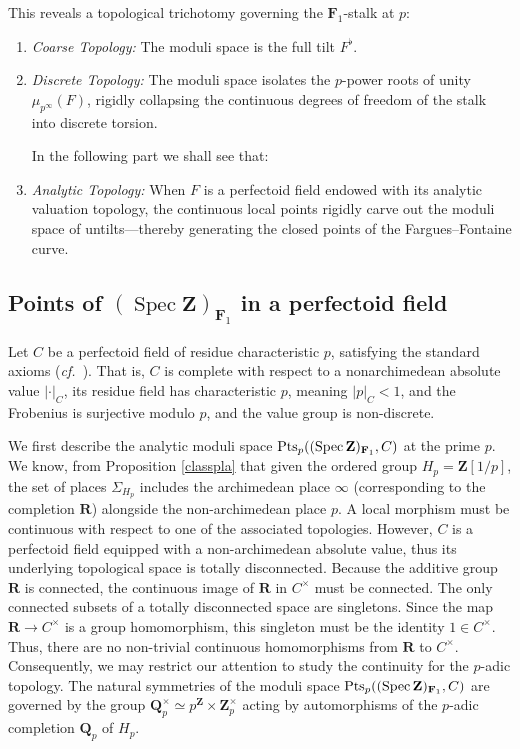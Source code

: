 \documentclass[11pt,a4paper]{article}
\newcommand{\Q}{\mathbf{Q}}
\newcommand{\R}{\mathbf{R}}
\newcommand{\Z}{\mathbf{Z}}
\newcommand{\Fone}{\mathbf{F}_{1}}
\def\spzf{(\Spec \Z)_{\mathbf{F}_{1}}}
\newcommand{\Pt}{{\rm Pts}}
\newcommand{\Spec}{\operatorname{Spec}}
\def\cf{{\it cf.\/}\ }
\begin{document}
This reveals a  topological trichotomy governing the $\Fone$-stalk at $p$:
\begin{enumerate}
    \item \emph{Coarse Topology:} The moduli space is the full tilt $F^\flat$.
    \item \emph{Discrete Topology:}  The moduli space isolates the $p$-power roots of unity $\mu_{p^\infty}(F)$, rigidly collapsing the continuous degrees of freedom of the stalk into discrete torsion.\vspace{.03in}

    In the following part we shall see that:
    
    \item \emph{Analytic Topology:} When $F$ is a perfectoid field endowed with its analytic valuation topology, the continuous local points rigidly carve out the moduli space of untilts---thereby generating the closed points of the Fargues--Fontaine curve.
    \end{enumerate}


    
    \subsection{Points of $\spzf$ in a perfectoid field}

  
    Let $C$ be a perfectoid field of residue characteristic $p$, satisfying the standard axioms (\cf \cite[Lecture 2, Def.~1]{Lurie}). That is, $C$  is complete with respect to a nonarchimedean absolute value $|\cdot|_C$, its residue field has characteristic $p$, meaning $|p|_C < 1$, and  the Frobenius is surjective modulo $p$, and the value group is non-discrete. \vspace{.03in}

We first describe the  analytic moduli space $\Pt_p(\spzf,C)$ at the prime $p$.   
 We know, from Proposition \ref{classpla} that given the ordered group $H_p=\Z[1/p]$, the set of places $\Sigma_{H_p}$ includes the archimedean place $\infty$ (corresponding to the completion $\R$) alongside the non-archimedean place $p$. A local morphism must be continuous with respect to one of the associated  topologies. 
However, $C$ is a perfectoid field equipped with a non-archimedean absolute value, thus its underlying topological space is totally disconnected. Because the additive group $\R$ is connected, the continuous image of $\R$ in $C^\times$ must be connected. The only connected subsets of a totally disconnected space are singletons. Since the map $\R\to C^\times$ is a group homomorphism, this singleton must be the identity $1 \in C^\times$. Thus, there are no non-trivial continuous homomorphisms from $\R$ to $C^\times$. Consequently,  we may restrict our attention  to study the continuity for the $p$-adic topology.
 The natural symmetries of the moduli space $\Pt_p(\spzf,C)$ are governed by the group $\Q_p^\times \simeq p^\Z \times \Z_p^\times$ acting by automorphisms of the $p$-adic completion $\Q_p$ of $H_p$. 
\end{document}
